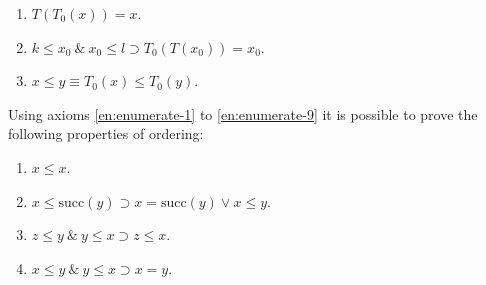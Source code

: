 \documentclass[twoside,11pt]{book}
\begin{document}
\begin{enumerate}[wide, nosep, label=(\arabic*)]
	\quad \textbf{type} $T = (k_1, k_2, \dots, k_n)$;

	\noindent
	where $T$ is the type name and $k_1, k_2 , \dots, k_n$ are names of all values of the type.
	
	The additional axiom for this type is:
	
	\tabto*{.9em}(10) $k_1 = T$.min
	
	\tabto*{1.8em}\& $k_2 = \text{succ}(k_1)$
	
	\tabto*{1.8em}\& $k_3 = \text{succ}(k_2)$
	
	\tabto*{3.8em}\dots
	
	\tabto*{1.8em}\& $k_n = \text{succ}(k_{n-1}) = T$.max.
	
	The general form of a definition of a type as a subrange is
	
	\quad \textbf{type} $T=k\,.\,.\,l;$
	
	\noindent
	where $k$ and $l$ are of the base type $T_0$.
	
	The additional axioms for this type are:
	
	\tabto*{.9em}(10) $T$.min $= k$
	
	\tabto*{1.8em}\& $T$.max $= l$.

	\setcounter{enumi}{10}
	\item $T(T_0(x)) = x$.

	\item $k \leqslant x_0\ \&\ x_0 \leqslant l \supset T_0(T(x_0)) = x_0$.

	\item $x \leqslant y \equiv T_0(x) \leqslant T_0(y).$
\end{enumerate}

Using axioms \ref{en:enumerate-1} to \ref{en:enumerate-9} it is possible to prove the following properties of ordering:

\begin{enumerate}[wide, nosep, label=(T\arabic*)]
	\item $x \leqslant x$.

	\item \label{en:enumeration-axiom-2}
	$x \leqslant \text{succ}(y) \supset x = \text{succ}(y) \vee x \leqslant y$.
	
	\item \label{en:enumeration-axiom-3}
	$z \leqslant y\ \&\ y \leqslant x \supset z \leqslant x.$
	
	\item $x \leqslant y\ \&\ y \leqslant x \supset x = y.$
\end{enumerate}
\end{document}

